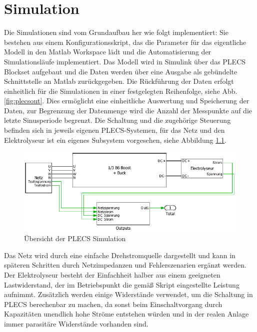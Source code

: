 \chapter{Simulation}
Die Simulationen sind vom Grundaufbau her wie folgt implementiert: Sie bestehen aus einem Konfigurationsskript, das die Parameter für das eigentliche Modell in den Matlab Workspace lädt und die Automatisierung der Simulationsläufe implementiert. Das Modell wird in Simulink über das PLECS Blockset aufgebaut und die Daten werden über eine Ausgabe als gebündelte Schnittstelle an Matlab zurückgegeben. Die Rückführung der Daten erfolgt einheitlich für die Simulationen in einer festgelegten Reihenfolge, siehe Abb. \ref{fig:plecsout}. Dies ermöglicht eine einheitliche Auswertung und Speicherung der Daten, zur Begrenzung der Datenmenge wird die Anzahl der Messpunkte auf die letzte Sinusperiode begrenzt. Die Schaltung und die zugehörige Steuerung befinden sich in jeweils eigenen PLECS-Systemen, für das Netz und den Elektrolyseur ist ein eigenes Subsystem vorgesehen, siehe Abbildung \ref{fig:plecssimulationsaufbau}.  
\begin{figure}[H]
\centering
\includegraphics[width=1\linewidth]{content/Grafiken/PLECS_Simulationsaufbau}
\caption{Übersicht der PLECS Simulation}
\label{fig:plecssimulationsaufbau}
\end{figure}
Das Netz wird durch eine einfache Drehstromquelle dargestellt und kann in späteren Schritten durch Netzimpedanzen und Fehlerszenarien ergänzt werden. Der Elektrolyseur besteht der Einfachheit halber aus einem geeigneten Lastwiderstand, der im Betriebspunkt die gemäß Skript eingestellte Leistung aufnimmt. Zusätzlich werden einige Widerstände verwendet, um die Schaltung in \gls{PLECS} berechenbar zu machen, da sonst beim Einschaltvorgang durch Kapazitäten unendlich hohe Ströme entstehen würden und in der realen Anlage immer parasitäre Widerstände vorhanden sind.
